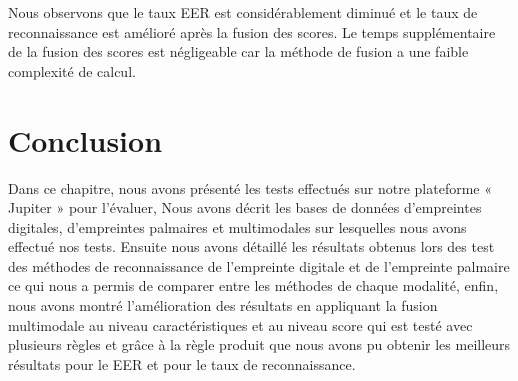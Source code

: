 Nous observons que le taux EER est considérablement diminué et le taux de reconnaissance est amélioré après la fusion des scores. Le temps supplémentaire de la fusion des scores est négligeable car la méthode de fusion a une faible complexité de calcul.



\section{Conclusion}
Dans ce chapitre, nous avons présenté les tests effectués sur notre plateforme « Jupiter » pour l’évaluer, Nous avons décrit les bases de données d’empreintes digitales, d’empreintes palmaires et multimodales sur lesquelles nous avons effectué nos tests. Ensuite nous avons détaillé les résultats obtenus lors des test des méthodes de reconnaissance de l’empreinte digitale et de l'empreinte palmaire ce qui nous a permis de comparer entre les méthodes de chaque modalité, enfin, nous avons montré l’amélioration des résultats en appliquant la fusion multimodale au niveau caractéristiques et au niveau score qui est testé avec plusieurs règles et grâce à la règle produit que nous avons pu obtenir les meilleurs résultats pour le EER et pour le taux de reconnaissance.	